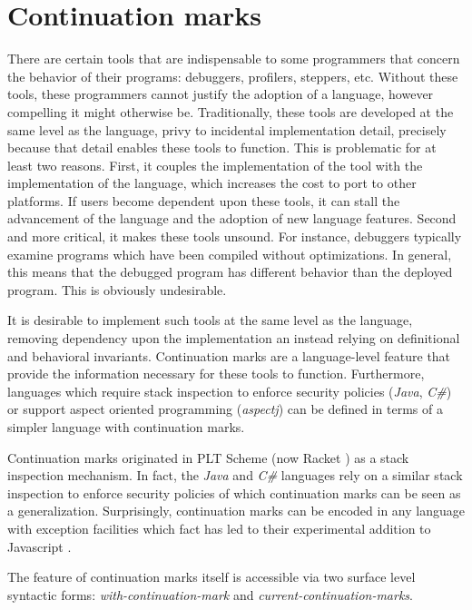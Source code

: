 \documentclass[ms,electronic,twosidetoc,letterpaper,chaptercenter,parttop]{byumsphd}
\begin{document}
\section{Continuation marks}

There are certain tools that are indispensable to some programmers that concern the
behavior of their programs: debuggers, profilers, steppers, etc. Without these tools,
these programmers cannot justify the adoption of a language, however compelling it might
otherwise be. Traditionally, these tools are developed at the same level as the 
language, privy to incidental implementation detail, precisely because that detail 
enables these tools to function. This is problematic for at least two reasons. First, 
it couples the implementation of the tool with the implementation of the language, which
increases the cost to port to other platforms. If users become dependent upon these tools,
it can stall the advancement of the language and the adoption of new language features.
Second and more critical, it makes these tools unsound. For instance, debuggers typically
examine programs which have been compiled without optimizations. In general, this means 
that the debugged program has different behavior than the deployed program. This is 
obviously undesirable.

It is desirable to implement such tools at the same level as the language, removing
dependency upon the implementation an instead relying on definitional and behavioral
invariants. Continuation marks are a language-level feature that provide the information
necessary for these tools to function. Furthermore, languages which require stack
inspection to enforce security policies (\emph{Java}, \emph{C\#}) or support aspect
oriented programming (\emph{aspectj}) can be defined in terms of a simpler language with
continuation marks.

Continuation marks originated in PLT Scheme (now Racket \cite{plt-tr1}) as a stack 
inspection mechanism. In fact, the \emph{Java} and \emph{C\#} languages rely on a similar 
stack inspection to enforce security policies of which continuation marks can be seen as 
a generalization. Surprisingly, continuation marks can be encoded in any language with 
exception facilities \cite{pettyjohn2005continuations} which fact has led to their 
experimental addition to Javascript \cite{clements2008implementing}.

The feature of continuation marks itself is accessible via two surface level syntactic
forms: \emph{with-continuation-mark} and \emph{current-continuation-marks}.
\end{document}

